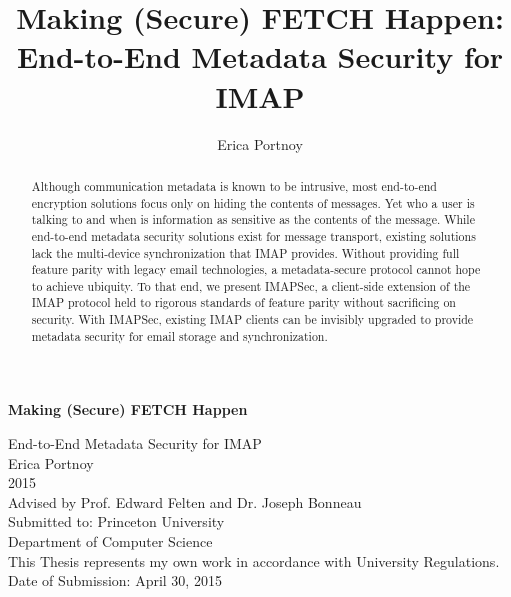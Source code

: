 \documentclass[pageno]{jpaper}
\newcommand{\project}{IMAPSec }
\newcommand{\projectnospace}{IMAPSec}
\begin{document}
\title{Making (Secure) FETCH Happen:
\\ \vspace{2 mm} {\large End-to-End Metadata Security for IMAP}}


\author{Erica Portnoy}

\date{}


\begin{titlepage}
\begin{center}

{ \huge \bfseries Making (Secure) FETCH Happen \\[0.5cm] }

{\LARGE End-to-End Metadata Security for IMAP}\\[1.5cm]

{\large Erica Portnoy\\
2015\\
Advised by Prof. Edward Felten and Dr. Joseph Bonneau\\
Submitted to: Princeton University\\
Department of Computer Science}\\[1.5cm]

{\large This Thesis represents my own work in accordance with University Regulations.}\\[6cm]

{\large Date of Submission: April 30, 2015}


\end{center}
\end{titlepage}


\thispagestyle{empty}

\vspace*{2 cm}

\begin{abstract}
Although communication metadata is known to be intrusive, most end-to-end encryption solutions focus only on hiding the contents of messages. Yet who a user is talking to and when is information as sensitive as the contents of the message. While end-to-end metadata security solutions exist for message transport, existing solutions lack the multi-device synchronization that IMAP provides. Without providing full feature parity with legacy email technologies, a metadata-secure protocol cannot hope to achieve ubiquity. To that end, we present \projectnospace, a client-side extension of the IMAP protocol held to rigorous standards of feature parity without sacrificing on security. With \projectnospace, existing IMAP clients can be invisibly upgraded to provide metadata security for email storage and synchronization.
\end{abstract}
\end{document}
